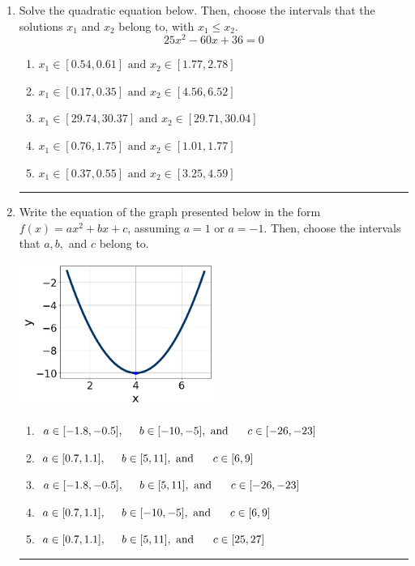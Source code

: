 \documentclass[14pt]{extbook}
\newcommand{\litem}[1]{\item#1\hspace*{-1cm}\rule{\textwidth}{0.4pt}}
\begin{document}
\begin{enumerate}
\litem{
Solve the quadratic equation below. Then, choose the intervals that the solutions $x_1$ and $x_2$ belong to, with $x_1 \leq x_2$.\[ 25x^{2} -60 x + 36 = 0 \]\begin{enumerate}[label=\Alph*.]
\item \( x_1 \in [0.54, 0.61] \text{ and } x_2 \in [1.77, 2.78] \)
\item \( x_1 \in [0.17, 0.35] \text{ and } x_2 \in [4.56, 6.52] \)
\item \( x_1 \in [29.74, 30.37] \text{ and } x_2 \in [29.71, 30.04] \)
\item \( x_1 \in [0.76, 1.75] \text{ and } x_2 \in [1.01, 1.77] \)
\item \( x_1 \in [0.37, 0.55] \text{ and } x_2 \in [3.25, 4.59] \)

\end{enumerate} }
\litem{
Write the equation of the graph presented below in the form $f(x)=ax^2+bx+c$, assuming  $a=1$ or $a=-1$. Then, choose the intervals that $a, b,$ and $c$ belong to.
\begin{center}
    \includegraphics[width=0.5\textwidth]{../Figures/quadraticGraphToEquationC.png}
\end{center}
\begin{enumerate}[label=\Alph*.]
\item \( a \in [-1.8, -0.5], \hspace*{5mm} b \in [-10, -5], \text{ and } \hspace*{5mm} c \in [-26, -23] \)
\item \( a \in [0.7, 1.1], \hspace*{5mm} b \in [5, 11], \text{ and } \hspace*{5mm} c \in [6, 9] \)
\item \( a \in [-1.8, -0.5], \hspace*{5mm} b \in [5, 11], \text{ and } \hspace*{5mm} c \in [-26, -23] \)
\item \( a \in [0.7, 1.1], \hspace*{5mm} b \in [-10, -5], \text{ and } \hspace*{5mm} c \in [6, 9] \)
\item \( a \in [0.7, 1.1], \hspace*{5mm} b \in [5, 11], \text{ and } \hspace*{5mm} c \in [25, 27] \)


\end{enumerate}}
\end{enumerate}
\end{document}
